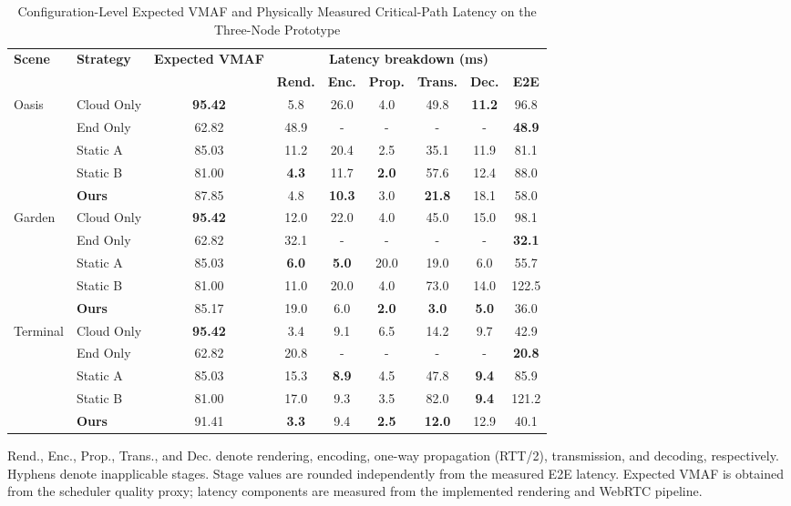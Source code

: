 \documentclass[10pt,journal,compsoc]{IEEEtran}
\begin{document}
\begin{table}[t]
	\centering
	\caption{Configuration-Level Expected VMAF and Physically Measured Critical-Path Latency on the Three-Node Prototype}
	\label{tab:prototype_summary}
	\footnotesize
	\setlength{\tabcolsep}{5pt}
	\renewcommand{\arraystretch}{1.0}
	\begin{tabular*}{\textwidth}{@{\extracolsep{\fill}}llccccccc@{}}
		\toprule
		\multirow{2}{*}{\textbf{Scene}} & \multirow{2}{*}{\textbf{Strategy}} & \multirow{2}{*}{\textbf{Expected VMAF}} &
		\multicolumn{6}{c}{\textbf{Latency breakdown (ms)}} \\
		\cmidrule(lr){4-9}
		& & & \textbf{Rend.} & \textbf{Enc.} & \textbf{Prop.} &
		\textbf{Trans.} & \textbf{Dec.} & \textbf{E2E} \\
		\midrule
		\multirow{5}{*}{Oasis}
		& Cloud Only & \textbf{95.42} & 5.8 & 26.0 & 4.0 & 49.8 & \textbf{11.2} & 96.8 \\
		& End Only & 62.82 & 48.9 & - & - & - & - & \textbf{48.9} \\
		& Static A & 85.03 & 11.2 & 20.4 & 2.5 & 35.1 & 11.9 & 81.1 \\
		& Static B & 81.00 & \textbf{4.3} & 11.7 & \textbf{2.0} & 57.6 & 12.4 & 88.0 \\
		& \textbf{Ours} & 87.85 & 4.8 & \textbf{10.3} & 3.0 & \textbf{21.8} & 18.1 & 58.0 \\
		\midrule
		\multirow{5}{*}{Garden}
		& Cloud Only & \textbf{95.42} & 12.0 & 22.0 & 4.0 & 45.0 & 15.0 & 98.1 \\
		& End Only & 62.82 & 32.1 & - & - & - & - & \textbf{32.1} \\
		& Static A & 85.03 & \textbf{6.0} & \textbf{5.0} & 20.0 & 19.0 & 6.0 & 55.7 \\
		& Static B & 81.00 & 11.0 & 20.0 & 4.0 & 73.0 & 14.0 & 122.5 \\
		& \textbf{Ours} & 85.17 & 19.0 & 6.0 & \textbf{2.0} & \textbf{3.0} & \textbf{5.0} & 36.0 \\
		\midrule
		\multirow{5}{*}{Terminal}
		& Cloud Only & \textbf{95.42} & 3.4 & 9.1 & 6.5 & 14.2 & 9.7 & 42.9 \\
		& End Only & 62.82 & 20.8 & - & - & - & - & \textbf{20.8} \\
		& Static A & 85.03 & 15.3 & \textbf{8.9} & 4.5 & 47.8 & \textbf{9.4} & 85.9 \\
		& Static B & 81.00 & 17.0 & 9.3 & 3.5 & 82.0 & \textbf{9.4} & 121.2 \\
		& \textbf{Ours} & 91.41 & \textbf{3.3} & 9.4 & \textbf{2.5} & \textbf{12.0} & 12.9 & 40.1 \\
		\bottomrule
	\end{tabular*}
	\par\smallskip
	\raggedright\scriptsize Rend., Enc., Prop., Trans., and Dec. denote rendering,
	encoding, one-way propagation (RTT/2), transmission, and decoding, respectively.
	Hyphens denote inapplicable stages. Stage values are rounded independently from the
	measured E2E latency. Expected VMAF is obtained from the scheduler quality proxy; latency components are measured from the implemented rendering and WebRTC pipeline.\par
\end{table}
\end{document}
